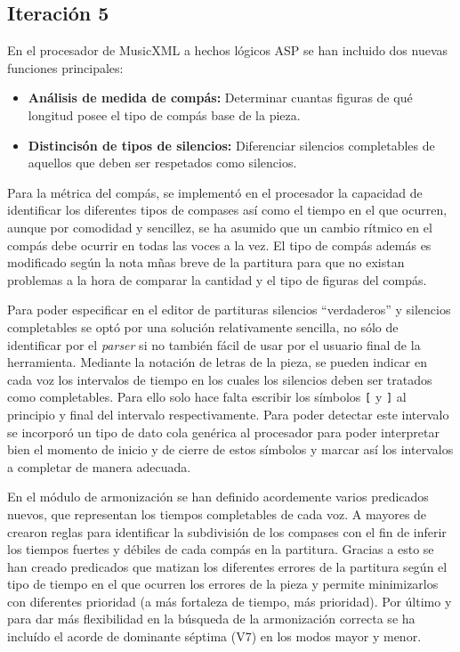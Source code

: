 \subsection{Iteración 5}
\label{subsec:fifth_iteration}
En el procesador de MusicXML a hechos lógicos ASP se han incluido dos nuevas funciones principales: 
\begin{itemize}
	\item \textbf{Análisis de medida de compás:} Determinar cuantas figuras de qué longitud posee el tipo de compás base de la pieza.
	\item \textbf{Distincisón de tipos de silencios:} Diferenciar silencios completables de aquellos que deben ser respetados como silencios.
\end{itemize}

Para la métrica del compás, se implementó en el procesador la capacidad de identificar los diferentes tipos de compases así como el tiempo en el que ocurren, aunque por comodidad y sencillez, se ha asumido que un cambio rítmico en el compás debe ocurrir en todas las voces a la vez. El tipo de compás además es modificado según la nota mñas breve de la partitura para que no existan problemas a la hora de comparar la cantidad y el tipo de figuras del compás.

Para poder especificar en el editor de partituras silencios ``verdaderos'' y silencios completables se optó por una solución relativamente sencilla, no sólo de identificar por el \textit{parser} si no también fácil de usar por el usuario final de la herramienta. Mediante la notación de letras de la pieza, se pueden indicar en cada voz los intervalos de tiempo en los cuales los silencios deben ser tratados como completables. Para ello solo hace falta escribir los símbolos \texttt{[} y \texttt{]} al principio y final del intervalo respectivamente. Para poder detectar este intervalo se incorporó un tipo de dato cola genérica al procesador para poder interpretar bien el momento de inicio y de cierre de estos símbolos y marcar así los intervalos a completar de manera adecuada.

En el módulo de armonización se han definido acordemente varios predicados nuevos, que representan los tiempos completables de cada voz. A mayores de crearon reglas para identificar la subdivisión de los compases con el fin de inferir los tiempos fuertes y débiles de cada compás en la partitura. Gracias a esto se han creado predicados que matizan los diferentes errores de la partitura según el tipo de tiempo en el que ocurren los errores de la pieza y permite minimizarlos con diferentes prioridad (a más fortaleza de tiempo, más prioridad). Por último y para dar más flexibilidad en la búsqueda de la armonización correcta se ha incluído el acorde de dominante séptima (V7) en los modos mayor y menor.


